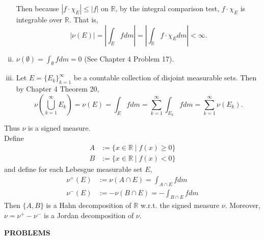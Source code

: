 \begin{flushleft}
\begin{enumerate}[(i)]
		Then because $|f\cdot\chi_E|\le|f|$ on $\mathbb{R}$, by the integral comparison test, $f\cdot\chi_E$ is integrable over $\mathbb{R}$.
		That is,
		\[
			|\nu(E)|=\left|\int_Efdm\right|=\left|\int_\mathbb{R}f\cdot\chi_Edm\right|<\infty.
		\]
		\item $\nu(\emptyset)=\int_\emptyset f dm=0$ (See Chapter 4 Problem 17).
		\item Let $E=\{E_k\}_{k=1}^\infty$ be a countable collection of disjoint measurable sets.
		Then by Chapter 4 Theorem 20,
		\[
			\nu\left(\bigcup_{k=1}^\infty E_k\right)=\nu(E)=\int_{E}fdm=\sum_{k=1}^\infty\int_{E_k}fdm=\sum_{k=1}^\infty\nu(E_k).
		\]
	\end{enumerate}
	Thus $\nu$ is a signed measure.
	\\Define 
	\begin{align*}
		A&:=\{x\in\mathbb{R}\mid f(x)\ge0\}\\
		B&:=\{x\in\mathbb{R}\mid f(x)<0\}
	\end{align*}
	and define for each Lebesgue measurable set $E$,
	\begin{align*}
		\nu^+(E)&:=\nu(A\cap E)=\int_{A\cap E} f dm\\
		\nu^-(E)&:=-\nu(B\cap E)=-\int_{B\cap E} f dm
	\end{align*}
	Then $\{A,B\}$ is a Hahn decomposition of $\mathbb{R}$ w.r.t. the signed measure $\nu$.
	Moreover, $\nu=\nu^+-\nu^-$ is a Jordan decomposition of $\nu$.
\end{flushleft}
\begin{center}
	\textbf{PROBLEMS}
\end{center}
